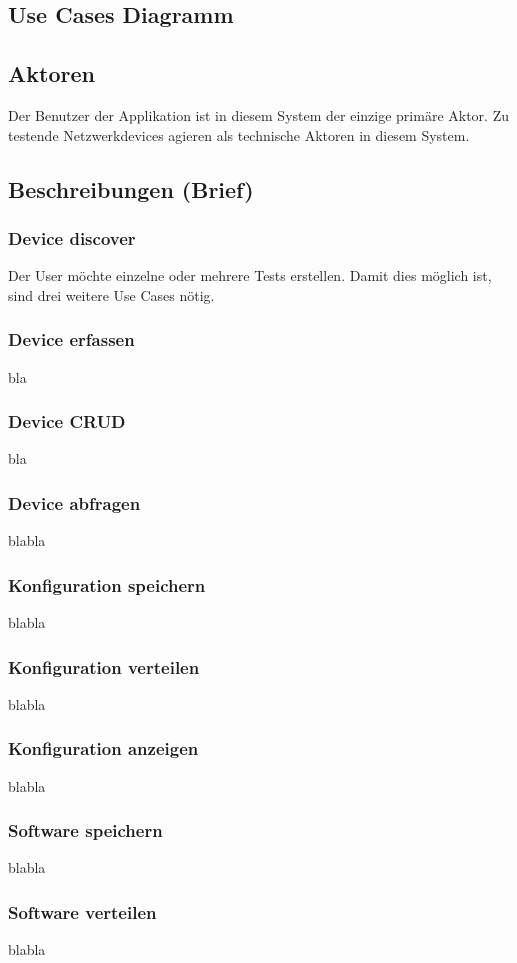 \subsection{Use Cases Diagramm}
\subsection{Aktoren}
Der Benutzer der Applikation ist in diesem System der einzige primäre Aktor. Zu testende Netzwerkdevices agieren als technische Aktoren in diesem System.
\subsection{Beschreibungen (Brief)}
\subsubsection{Device discover}
Der User möchte einzelne oder mehrere Tests erstellen. Damit dies möglich ist, sind drei weitere Use Cases nötig.
\subsubsection{Device erfassen}
bla
\subsubsection{Device CRUD}
bla
\subsubsection{Device abfragen}
blabla
\subsubsection{Konfiguration speichern}
blabla
\subsubsection{Konfiguration verteilen}
blabla
\subsubsection{Konfiguration anzeigen}
blabla
\subsubsection{Software speichern}
blabla
\subsubsection{Software verteilen}
blabla
